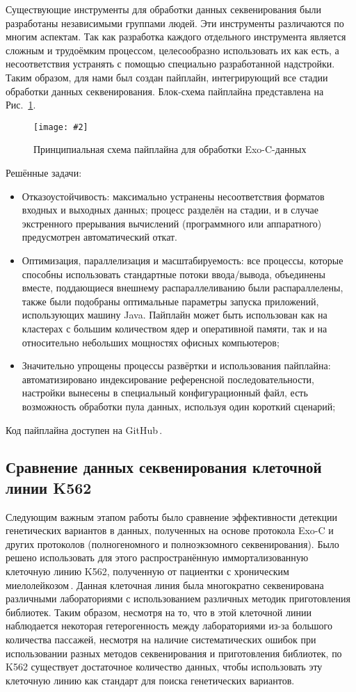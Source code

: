 \documentclass[a4paper,14pt]{extarticle}
\newcommand{\centerfigure}[5]
{\begin{figure}[#1]\centering\texttt{[image: \#2]}\caption{\label{#3}#4}\end{figure}}
\newcommand{\ecitep}[1]{\textenglish{\citep{#1}}}
\newcommand{\picref}[1]{Рис.~\ref{#1}}
\begin{document}
Существующие инструменты для обработки данных секвенирования были разработаны независимыми группами людей.
Эти инструменты различаются по многим аспектам.
Так как разработка каждого отдельного инструмента является сложным и трудоёмким процессом, целесообразно использовать их как есть, а несоответствия устранять с помощью специально разработанной надстройки.
Таким образом, для нами был создан пайплайн, интегрирующий все стадии обработки данных секвенирования.
Блок-схема пайплайна представлена на \picref{fig:pipeline}.

\centerfigure{h}{BlockScheme.pdf}{fig:pipeline}{Принципиальная схема пайплайна для обработки Exo-C-данных}{1}

Решённые задачи:

\begin{itemize}
	\item Отказоустойчивость: максимально устранены несоответствия форматов входных и выходных данных; процесс разделён на стадии, и в случае экстренного прерывания вычислений (программного или аппаратного) предусмотрен автоматический откат.
	\item Оптимизация, параллелизация и масштабируемость: все процессы, которые способны использовать стандартные потоки ввода/вывода, объединены вместе, поддающиеся внешнему распараллеливанию были распараллелены, также были подобраны оптимальные параметры запуска приложений, использующих машину Java.
	 Пайплайн может быть использован как на кластерах с большим количеством ядер и оперативной памяти, так и на относительно небольших мощностях офисных компьютеров;
	\item Значительно упрощены процессы развёртки и использования пайплайна: автоматизировано индексирование референсной последовательности, настройки вынесены в специальный конфигурационный файл, есть возможность обработки пула данных, используя один короткий сценарий;
\end{itemize}

Код пайплайна доступен на GitHub\,\ecitep{Scissors}.

\subsection{Сравнение данных секвенирования клеточной линии K562}

Следующим важным этапом работы было сравнение эффективности детекции генетических вариантов в данных, полученных на основе протокола Exo-C и других протоколов (полногеномного и полноэкзомного секвенирования).
Было решено использовать для этого распространённую иммортализованную клеточную линию K562, полученную от пациентки с хроническим миелолейкозом\,\ecitep{Lozzio_1975}.
Данная клеточная линия была многократно секвенирована различными лабораториями с использованием различных методик приготовления библиотек.
Таким образом, несмотря на то, что в этой клеточной линии наблюдается некоторая гетерогенность между лабораториями из-за большого количества пассажей, несмотря на наличие систематических ошибок при использовании разных методов секвенирования и приготовления библиотек, по K562 существует достаточное количество данных, чтобы использовать эту клеточную линию как стандарт для поиска генетических вариантов.
\end{document}
